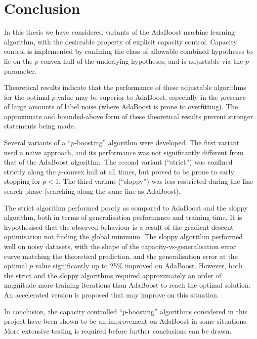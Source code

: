 
\chapter{Conclusion}
\label{chapter:conclusion}

In this thesis we have considered variants of the AdaBoost machine
learning algorithm, with the desireable property of explicit capacity
control.  Capacity control is implemented by confining the class of
allowable combined hypotheses to lie on the $p$-convex hull of the
underlying hypotheses, and is adjustable via the $p$ parameter.

Theoretical results indicate that the performance of these adjustable
algorithms for the optimal $p$ value may be superior to AdaBoost,
especially in the presence of large amounts of label noise (where
AdaBoost is prone to overfitting).  The approximate and bounded-above
form of these theoretical results prevent stronger statements being
made.

Several variants of a ``$p$-boosting'' algorithm were developed.  The
first variant used a na\"{\i}ve approach, and its performance was not
significantly different from that of the AdaBoost algorithm.  The
second variant (``strict'') was confined strictly along the $p$-convex
hull at all times, but proved to be prone to early stopping for $p <
1$.  The third variant (``sloppy'') was less restricted during the
line search phase (searching along the same line as AdaBoost).

The strict algorithm performed poorly as compared to AdaBoost and the
sloppy algorithm, both in terms of generalisation performance and
training time.  It is hypothesised that the observed behaviour is a
result of the gradient descent optimisation not finding the global
minimum.  The sloppy algorithm performed well on noisy datasets, with
the shape of the capacity-vs-generalisation error curve matching the
theoretical prediction, and the generalisation error at the optimal
$p$ value significantly up to 25\% improved on AdaBoost.  However,
both the strict and the sloppy algorithms required approximately an
order of magnitude more training iterations than AdaBoost to reach the
optimal solution.  An accelerated version is proposed that may improve
on this situation.

In conclusion, the capacity controlled ``$p$-boosting'' algorithms
considered in this project have been shown to be an improvement on
AdaBoost in some situations.  More extensive testing is required
before further conclusions can be drawn.
